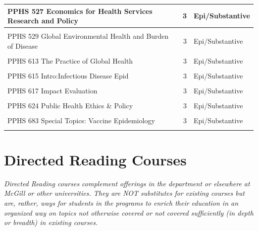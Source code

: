 \documentclass[
]{book}
\begin{document}
\begin{table}
{\begin{tabular}[t]{l|r|l}
\hline
PPHS 527 Economics for Health Services Research and Policy & 3 & Epi/Substantive\\
\hline
\cellcolor{gray!6}{PPHS 528 Economic Evaluation of Health Programs} & \cellcolor{gray!6}{3} & \cellcolor{gray!6}{Epi/Substantive}\\
\hline
PPHS 529 Global Environmental Health and Burden of Disease & 3 & Epi/Substantive\\
\hline
\cellcolor{gray!6}{PPHS 612 Principles/Pub Hlth Practice} & \cellcolor{gray!6}{3} & \cellcolor{gray!6}{Epi/Substantive}\\
\hline
PPHS 613 The Practice of Global Health & 3 & Epi/Substantive\\
\hline
\cellcolor{gray!6}{PPHS 614 Knowledge Translation and Public Health Leadership} & \cellcolor{gray!6}{3} & \cellcolor{gray!6}{Epi/Substantive}\\
\hline
PPHS 615 Intro:Infectious Disease Epid & 3 & Epi/Substantive\\
\hline
\cellcolor{gray!6}{PPHS 616 Principles \& Practice of Public Health Surveillance} & \cellcolor{gray!6}{3} & \cellcolor{gray!6}{Epi/Substantive}\\
\hline
PPHS 617 Impact Evaluation & 3 & Epi/Substantive\\
\hline
\cellcolor{gray!6}{PPHS 618 Program Planning and Evaluation in Public Health} & \cellcolor{gray!6}{3} & \cellcolor{gray!6}{Epi/Substantive}\\
\hline
PPHS 624 Public Health Ethics \& Policy & 3 & Epi/Substantive\\
\hline
\cellcolor{gray!6}{PPHS 682 Special Topics: Critical Perspectives on Global Health} & \cellcolor{gray!6}{2} & \cellcolor{gray!6}{Epi/Substantive}\\
\hline
PPHS 683 Special Topics: Vaccine Epidemiology & 3 & Epi/Substantive\\
\hline
\cellcolor{gray!6}{PPHS 684 Special Topics: Foundations of Health Promotion} & \cellcolor{gray!6}{3} & \cellcolor{gray!6}{Epi/Substantive}\\
\hline
\end{tabular}}
\end{table}

\hypertarget{directed-reading-courses}{%
\section{Directed Reading Courses}\label{directed-reading-courses}}

\emph{Directed Reading courses complement offerings in the department or elsewhere at McGill or other universities. They are NOT substitutes for existing courses but are, rather, ways for students in the programs to enrich their education in an organized way on topics not otherwise covered or not covered sufficiently (in depth or breadth) in existing courses.}
\end{document}
